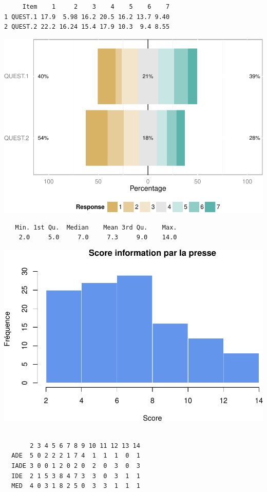 \documentclass[]{article}
\begin{document}
\begin{verbatim}
     Item    1     2    3    4    5    6    7
1 QUEST.1 17.9  5.98 16.2 20.5 16.2 13.7 9.40
2 QUEST.2 22.2 16.24 15.4 17.9 10.3  9.4 8.55
\end{verbatim}

\includegraphics{analyse_files/figure-latex/unnamed-chunk-14-3.pdf}

\begin{verbatim}
   Min. 1st Qu.  Median    Mean 3rd Qu.    Max. 
    2.0     5.0     7.0     7.3     9.0    14.0 
\end{verbatim}

\includegraphics{analyse_files/figure-latex/unnamed-chunk-14-4.pdf}

\begin{verbatim}
      
       2 3 4 5 6 7 8 9 10 11 12 13 14
  ADE  5 0 2 2 2 1 7 4  1  1  1  0  1
  IADE 3 0 0 1 2 0 2 0  2  0  3  0  3
  IDE  2 1 5 3 8 4 7 3  3  0  3  1  1
  MED  4 0 3 1 8 2 5 0  3  3  1  1  1
\end{verbatim}
\end{document}
